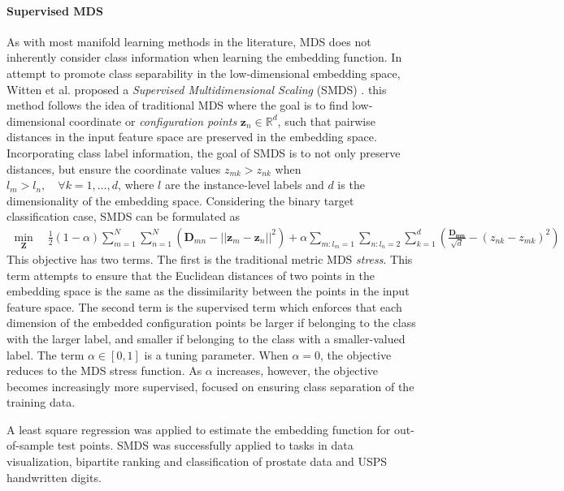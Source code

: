 \paragraph{Supervised MDS}
As with most manifold learning methods in the literature, MDS does not inherently consider class information when learning the embedding function.  In attempt to promote class separability in the  low-dimensional embedding space, Witten et al. proposed a \textit{Supervised Multidimensional Scaling} (SMDS) \citep{Witten2011SuperMDS}.  this method follows the idea of traditional MDS where the goal is to find low-dimensional coordinate or \textit{configuration points} $\bm{z}_{n} \in \mathbb{R}^{d}$, such that pairwise distances in the input feature space are preserved in the  embedding space.  Incorporating class label information, the goal of SMDS is to not only preserve distances, but ensure the coordinate values $z_{mk} > z_{nk}$ when $l_{m} > l_{n}, \quad \forall k = 1, \dots, d$, where $l$ are the instance-level labels and $d$ is the dimensionality of the embedding space.  Considering the binary target classification case, SMDS can be formulated as
\begin{align}
	\min_{\bm{Z}} \quad \frac{1}{2}(1-\alpha)\sum_{m=1}^{N}\sum_{n=1}^{N}(\bm{D}_{mn} - ||\bm{z}_{m} - \bm{z}_{n} ||^{2}) + \alpha \sum_{m:l_{m}=1} \sum_{n:l_n=2} \sum_{k=1}^{d}\left(\frac{\bm{D_{mn}}}{\sqrt{d}} - (z_{nk} - z_{mk})^{2} \right)
\end{align}
This objective has two terms.  The first is the traditional metric MDS \textit{stress}.  This term attempts to ensure that the Euclidean distances of two points in the embedding space is the same as the dissimilarity between the points in the input feature space.  The second term is the supervised term which enforces that each dimension of the embedded configuration points be larger if belonging to the class with the larger label, and smaller if belonging to the class with a smaller-valued label.  The term $\alpha \in [0,1]$ is a tuning parameter.  When $\alpha = 0$, the objective reduces to the MDS stress function.  As $\alpha$ increases, however, the objective becomes increasingly more supervised, focused on ensuring class separation of the training data.

A least square regression was applied to estimate the embedding function for out-of-sample  test points.  SMDS was successfully applied to tasks in data visualization, bipartite ranking and classification of prostate data and USPS handwritten digits.

